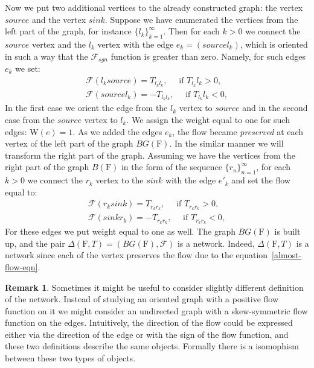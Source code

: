 \documentclass[12pt]{article}
\theoremstyle{definition}
\newtheorem{remark}{Remark}
\newcommand{\seq}[1]{\{{#1}_n\}_{n=1}^\infty}
\newcommand{\fsys}{\mathrm{F}}
\newcommand{\wt}{\mathrm{W}}
\newcommand{\flow}{\mathcal{F}}
\newcommand{\flowsgn}{\mathcal{F}_{sgn}}
\newcommand{\source}{\mathit{source}}
\newcommand{\sink}{\mathit{sink}}
\newcommand{\net}{\Delta}
\numberwithin{remark}{section}
\numberwithin{theorem}{section}
\numberwithin{prop}{section}
\numberwithin{equation}{section}
\numberwithin{lemma}{section}
\numberwithin{prop_under_lemma}{lemma}
\begin{document}
    Now we put two additional vertices to the already constructed graph:
    the vertex $\source$ and the vertex $\sink$.
    Suppose we have enumerated the vertices from the left part of the graph, for instance $\{l_k\}_{k=1}^\infty$.
    Then for each $k > 0$ we connect the $\source$ vertex and the $l_k$ vertex with
    the edge $e_k = (\source l_k)$, which is oriented in such a way that the $\flowsgn$ function
    is greater than zero. Namely, for such edges $e_k$ we set:
    \begin{align*}
      \flow(l_k \source) = T_{l_k l_k}, \quad \text{ if } T_{l_k}{l_k} > 0,\\
      \flow(\source l_k) = -T_{l_k l_k}, \quad \text { if } T_{l_k}{l_k} < 0,
    \end{align*}
    In the first case we orient the edge from the $l_k$ vertex to $\source$ and in the second case from the 
    $\source$ vertex to $l_k$.
    We assign the weight equal to one for such edges: $\wt(e) = 1$.
    As we added the edges ${e_k}$, the flow became \emph{preserved} at each vertex of the left part of the graph $BG(\fsys)$.
    In the similar manner we will transform the right part of the graph.
    Assuming we have the vertices from the right part of the graph $B(\fsys)$ in the form of the sequence $\seq{r}$,
    for each $k > 0$ we connect the $r_k$ vertex to the $\sink$ with the edge $e'_k$
    and set the flow equal to:
    \begin{align*}
      \flow(r_k \sink) = T_{r_k r_k}, \quad \text{ if } T_{r_k r_k} > 0,\\
      \flow(\sink r_k) = -T_{r_k r_k}, \quad \text { if } T_{r_k r_k} < 0,
    \end{align*}
    For these edges we put weight equal to one as well.
    The graph $BG(\fsys)$ is built up, and the pair $\net(\fsys, T) = (BG(\fsys), \flow)$ is a network.
    Indeed, $\net(\fsys, T)$ is a network since each of the vertex preserves
    the flow due to the equation~\eqref{almost-flow-eqn}.
    \begin{remark}
      Sometimes it might be useful to consider slightly different definition of the network.
      Instead of studying an oriented graph with a positive flow function on it we might consider
      an undirected graph with a skew-symmetric flow function on the edges.
      Intuitively, the direction of the flow could be expressed either via the direction of the edge
      or with the sign of the flow function, and these two definitions describe the same objects.
      Formally there is a isomophism between these two types of objects.
    \end{remark}
\end{document}
